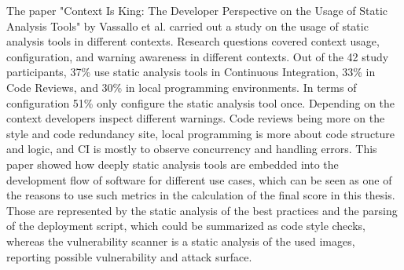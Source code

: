 The paper "Context Is King: The Developer Perspective on the Usage of Static Analysis Tools" \cite{8330195} by Vassallo et al. carried out a study on the usage of static analysis tools in different contexts. Research questions covered context usage, configuration, and warning awareness in different contexts. Out of the 42 study participants, 37\% use static analysis tools in Continuous Integration, 33\% in Code Reviews, and 30\% in local programming environments. In terms of configuration 51\% only configure the static analysis tool once. Depending on the context developers inspect different warnings. Code reviews being more on the style and code redundancy site, local programming is more about code structure and logic, and CI is mostly to observe concurrency and handling errors.
This paper showed how deeply static analysis tools are embedded into the development flow of software for different use cases, which can be seen as one of the reasons to use such metrics in the calculation of the final score in this thesis. Those are represented by the static analysis of the best practices and the parsing of the deployment script, which could be summarized as code style checks, whereas the vulnerability scanner is a static analysis of the used images, reporting possible vulnerability and attack surface.